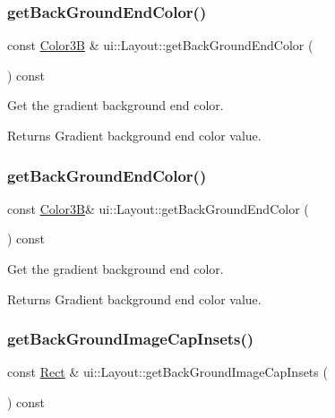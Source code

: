 \subsubsection{\texorpdfstring{get\+Back\+Ground\+End\+Color()}{getBackGroundEndColor()}\hspace{0.1cm}{\footnotesize\ttfamily [1/2]}}
{\footnotesize\ttfamily const \hyperlink{structColor3B}{Color3B} \& ui\+::\+Layout\+::get\+Back\+Ground\+End\+Color (\begin{DoxyParamCaption}{ }\end{DoxyParamCaption}) const}

Get the gradient background end color. \begin{DoxyReturn}{Returns}
Gradient background end color value. 
\end{DoxyReturn}
\mbox{\label{classui_1_1Layout_adfd6290274a4d051b72eec3100a14f3c}} 
\subsubsection{\texorpdfstring{get\+Back\+Ground\+End\+Color()}{getBackGroundEndColor()}\hspace{0.1cm}{\footnotesize\ttfamily [2/2]}}
{\footnotesize\ttfamily const \hyperlink{structColor3B}{Color3B}\& ui\+::\+Layout\+::get\+Back\+Ground\+End\+Color (\begin{DoxyParamCaption}{ }\end{DoxyParamCaption}) const}

Get the gradient background end color. \begin{DoxyReturn}{Returns}
Gradient background end color value. 
\end{DoxyReturn}
\mbox{\label{classui_1_1Layout_a88ecaa90dd5088ddb4c002a3975d858b}} 
\subsubsection{\texorpdfstring{get\+Back\+Ground\+Image\+Cap\+Insets()}{getBackGroundImageCapInsets()}\hspace{0.1cm}{\footnotesize\ttfamily [1/2]}}
{\footnotesize\ttfamily const \hyperlink{classRect}{Rect} \& ui\+::\+Layout\+::get\+Back\+Ground\+Image\+Cap\+Insets (\begin{DoxyParamCaption}{ }\end{DoxyParamCaption}) const}

